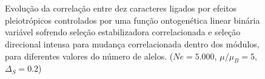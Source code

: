 \begin{figure}[htbp]
    \\
    \vspace{-18pt}
    \vspace{11pt}
    \\
    \caption{Evolução da correlação entre dez caracteres ligados por efeitos
        pleiotrópicos controlados por uma função ontogenética linear binária
        variável sofrendo seleção estabilizadora correlacionada e seleção
        direcional intensa para mudança correlacionada dentro dos módulos,
    para diferentes valores do número de alelos. ($Ne=5.000$, $\mu/\mu_B=5$, $\Delta_S=0.2$)}
    \label{MB}
\end{figure}
